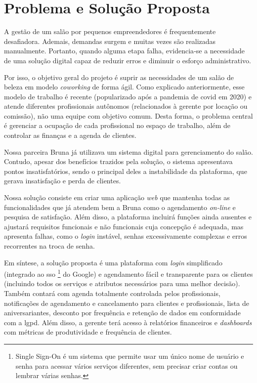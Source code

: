 \section{Problema e Solução Proposta}

A gestão de um salão por pequenos empreendedores é frequentemente desafiadora. Ademais, demandas surgem e muitas vezes são realizadas manualmente. Portanto, quando alguma etapa falha, evidencia‐se a necessidade de uma solução digital capaz de reduzir erros e diminuir o esforço administrativo.

Por isso, o objetivo geral do projeto é suprir as necessidades de um salão de beleza em modelo \emph{coworking} de forma ágil. Como explicado anteriormente, esse modelo de trabalho é recente (popularizado após a pandemia de \gls{covid} em 2020) e atende diferentes profissionais autônomos (relacionados à gerente por locação ou comissão), não uma equipe com objetivo comum. Desta forma, o problema central é gerenciar a ocupação de cada profissional no espaço de trabalho, além de controlar as finanças e a agenda de clientes.

Nossa parceira Bruna já utilizava um sistema digital para gerenciamento do salão. Contudo, apesar dos benefícios trazidos pela solução, o sistema apresentava pontos insatisfatórios, sendo o principal deles a instabilidade da plataforma, que gerava insatisfação e perda de clientes.

Nossa solução consiste em criar uma aplicação \emph{web} que mantenha todas as funcionalidades que já atendem bem a Bruna como o agendamento \emph{on-line} e pesquisa de satisfação. Além disso, a plataforma incluirá funções ainda ausentes e ajustará requisitos funcionais e não funcionais cuja concepção é adequada, mas apresenta falhas, como o \emph{login} instável, senhas excessivamente complexas e erros recorrentes na troca de senha.

Em síntese, a solução proposta é uma plataforma com \emph{login} simplificado (integrado ao \gls{sso} \footnote{Single Sign-On é um sistema que permite usar um único nome de usuário e senha para acessar vários serviços diferentes, sem precisar criar contas ou lembrar várias senhas.} do Google) e agendamento fácil e transparente para os clientes (incluindo todos os serviços e atributos necessários para uma melhor decisão). Também contará com agenda totalmente controlada pelos profissionais, notificações de agendamento e cancelamento para clientes e profissionais, lista de aniversariantes, desconto por frequência e retenção de dados em conformidade com a \gls{lgpd}. Além disso, a gerente terá acesso à relatórios financeiros e \emph{dashboards} com métricas de produtividade e frequência de clientes.
